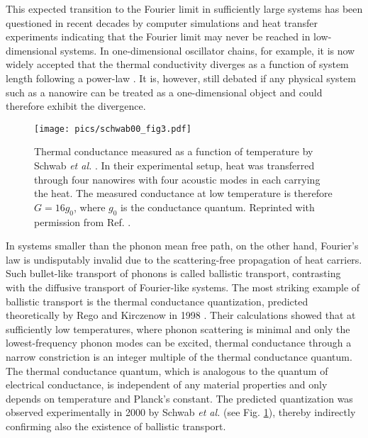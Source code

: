 This expected transition to the Fourier limit in sufficiently large systems has been questioned in recent decades by computer simulations \cite{lepri97,lepri03,mai07,dhar08} and heat transfer experiments \cite{yang10,xu14} indicating that the Fourier limit may never be reached in low-dimensional systems. In one-dimensional oscillator chains, for example, it is now widely accepted \cite{dhar08} that the thermal conductivity diverges as a function of system length following a power-law \cite{mai07}. It is, however, still debated \cite{marconnet13} if any physical system such as a nanowire can be treated as a one-dimensional object and could therefore exhibit the divergence. %

\begin{figure}
\begin{center}
 \texttt{[image: pics/schwab00\_fig3.pdf]}
 \caption{Thermal conductance measured as a function of temperature by Schwab \textit{et al.} \cite{schwab00}. In their experimental setup, heat was transferred through four nanowires with four acoustic modes in each carrying the heat. The measured conductance at low temperature is therefore $G=16g_0$, where $g_0$ is the conductance quantum. Reprinted with permission from Ref. \cite{schwab00}.}
\label{fig:intro_schwab}
\end{center}
\end{figure}

In systems smaller than the phonon mean free path, on the other hand, Fourier's law is undisputably invalid due to the scattering-free propagation of heat carriers. Such bullet-like transport of phonons is called ballistic transport, contrasting with the diffusive transport of Fourier-like systems. The most striking example of ballistic transport is the thermal conductance quantization, predicted theoretically by Rego and Kirczenow in 1998 \cite{rego98}. Their calculations showed that at sufficiently low temperatures, where phonon scattering is minimal and only the lowest-frequency phonon modes can be excited, thermal conductance through a narrow constriction is an integer multiple of the thermal conductance quantum. The thermal conductance quantum, which is analogous to the quantum of electrical conductance, is independent of any material properties and only depends on temperature and Planck's constant. The predicted quantization was observed experimentally in 2000 by Schwab \textit{et al.} \cite{schwab00} (see Fig. \ref{fig:intro_schwab}), thereby indirectly confirming also the existence of ballistic transport.

